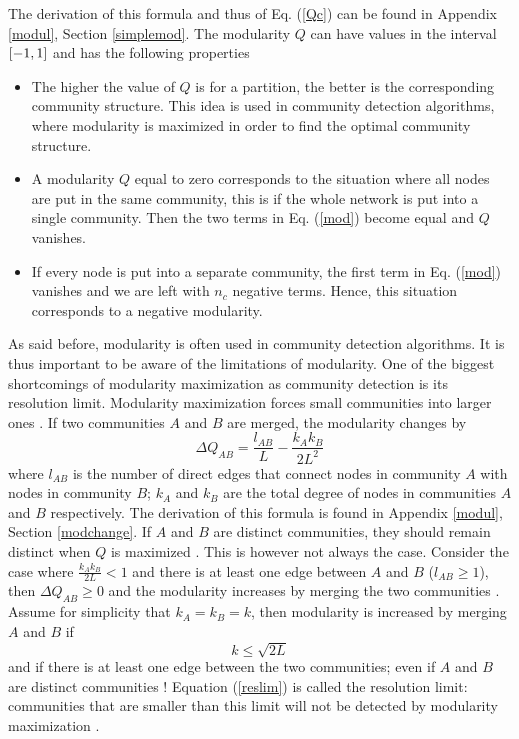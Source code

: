 \documentclass[11 pt , letterpaper , twoside , openright]{book}
\begin{document}
The derivation of this formula and thus of Eq. (\ref{Qc}) can be found in Appendix \ref{modul}, Section \ref{simplemod}. The modularity $Q$ can have values in the interval $\interval{-1}{1}$ and has the following properties \cite{Albert2016}
\begin{itemize}
	\item The higher the value of $Q$ is for a partition, the better is the corresponding community structure. This idea is used in community detection algorithms, where modularity is maximized in order to find the optimal community structure.
	\item A modularity $Q$ equal to zero corresponds to the situation where all nodes are put in the same community, this is if the whole network is put into a single community. Then the two terms in Eq. (\ref{mod}) become equal and $Q$ vanishes.
	\item If every node is put into a separate community, the first term in Eq. (\ref{mod}) vanishes and we are left with $n_c$ negative terms. Hence, this situation corresponds to a negative modularity.
\end{itemize}
As said before, modularity is often used in community detection algorithms. It is thus important to be aware of the limitations of modularity. One of the biggest shortcomings of modularity maximization as community detection is its resolution limit. Modularity maximization forces small communities into larger ones \cite{Albert2016}. If two communities $A$ and $B$ are merged, the modularity changes by \cite{Albert2016}
\begin{equation}
	\Delta Q_{AB} = \frac{l_{AB}}{L} - \frac{k_Ak_B}{2L^2}
\end{equation}
where $l_{AB}$ is the number of direct edges that connect nodes in community $A$ with nodes in community $B$; $k_A$ and $k_B$ are the total degree of nodes in communities $A$ and $B$ respectively. The derivation of this formula is found in Appendix \ref{modul}, Section \ref{modchange}. If $A$ and $B$ are distinct communities, they should remain distinct when $Q$ is maximized \cite{Albert2016}. This is however not always the case. Consider the case where $\frac{k_Ak_B}{2L} < 1$ and there is at least one edge between $A$ and $B$ ($l_{AB} \geqslant 1$), then $\Delta Q_{AB} \geqslant 0$ and the modularity increases by merging the two communities \cite{Albert2016}. Assume for simplicity that $k_A = k_B = k$, then modularity is increased by merging $A$ and $B$ if
\begin{equation}\label{reslim}
	k \leqslant \sqrt{2L}
\end{equation}
and if there is at least one edge between the two communities; even if $A$ and $B$ are distinct communities \cite{Albert2016}! Equation (\ref{reslim}) is called the resolution limit: communities that are smaller than this limit will not be detected by modularity maximization \cite{Albert2016}.
\end{document}

